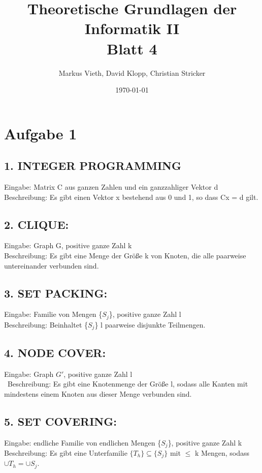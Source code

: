 \documentclass[a4paper,11pt,twoside]{article}
\title{Theoretische Grundlagen der Informatik II\\ Blatt 4}
\author{Markus Vieth, David Klopp, Christian Stricker}
\date{\today}
\begin{document}
\maketitle
\cleardoublepage
\pagestyle{myheadings}

\section*{Aufgabe 1}
\subsection*{1. INTEGER PROGRAMMING}
Eingabe: Matrix C aus ganzen Zahlen und ein ganzzahliger Vektor d \\
Beschreibung: Es gibt einen Vektor x bestehend aus 0 und 1, so dass Cx = d gilt.\\

\subsection*{2. CLIQUE:}
Eingabe: Graph G, positive ganze Zahl k\\
Beschreibung: Es gibt eine Menge der Größe k von Knoten, die alle paarweise untereinander verbunden sind.\\

\subsection*{3. SET PACKING:}
Eingabe: Familie von Mengen \{$S_j$\}, positive ganze Zahl l\\
Beschreibung: Beinhaltet \{$S_j$\} l paarweise disjunkte Teilmengen.\\

\subsection*{4. NODE COVER:}
Eingabe: Graph $G'$, positive ganze Zahl l\\\
Beschreibung: Es gibt eine Knotenmenge der Größe l, sodass alle Kanten mit mindestens einem Knoten aus dieser Menge verbunden sind.\\

\subsection*{5. SET COVERING:}
Eingabe: endliche Familie von endlichen Mengen \{$S_j$\}, positive ganze Zahl k\\
Beschreibung: Es gibt eine Unterfamilie  $\{T_h\} \subseteq \{S_j\}$ mit $\leq$ k Mengen, sodass $\cup T_h = \cup S_j$.\\
\end{document}

